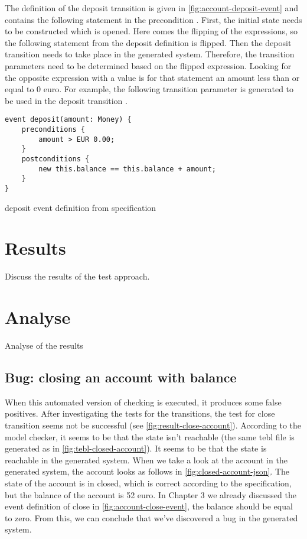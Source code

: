The definition of the deposit transition is given in
\autoref{fig:account-deposit-event} and contains the following statement in the
precondition . First, the initial state needs to be
constructed which is opened. Here comes the flipping of the expressions, so the
following statement from the deposit definition  is
flipped. Then the deposit transition needs to take place in the generated
system. Therefore, the transition parameters need to be determined based on the
flipped expression. Looking for the opposite expression with a value is for that
statement an amount less than or equal to 0 euro. For example, the following
transition parameter is generated to be used in the deposit transition
.

\begin{sourcecode}[h!]
\begin{lstlisting}[]
event deposit(amount: Money) {
	preconditions {
		amount > EUR 0.00;
	}
	postconditions {
		new this.balance == this.balance + amount;
	}
}
\end{lstlisting}
\caption{deposit event definition from specification}
\label{fig:account-deposit-event}
\end{sourcecode}

\section{Results}
Discuss the results of the test approach.

\section{Analyse}
Analyse of the results

\subsection{Bug: closing an account with balance}
\label{sec:bug-close-account}
When this automated version of checking is executed, it produces some false
positives. After investigating the tests for the transitions, the test for close
transition seems not be successful (see \autoref{fig:result-close-account}).
According to the model checker, it seems to be that the state isn't reachable
(the same tebl file is generated as in \autoref{fig:tebl-closed-account}). It
seems to be that the state is reachable in the generated system. When we take a
look at the account in the generated system, the account looks as follows in
\autoref{fig:closed-account-json}. The state of the account is in closed, which
is correct according to the specification, but the balance of the account is 52
euro. In Chapter 3 we already discussed the event definition of close in
\autoref{fig:account-close-event}, the balance should be equal to zero. From
this, we can conclude that we've discovered a bug in the generated system.

